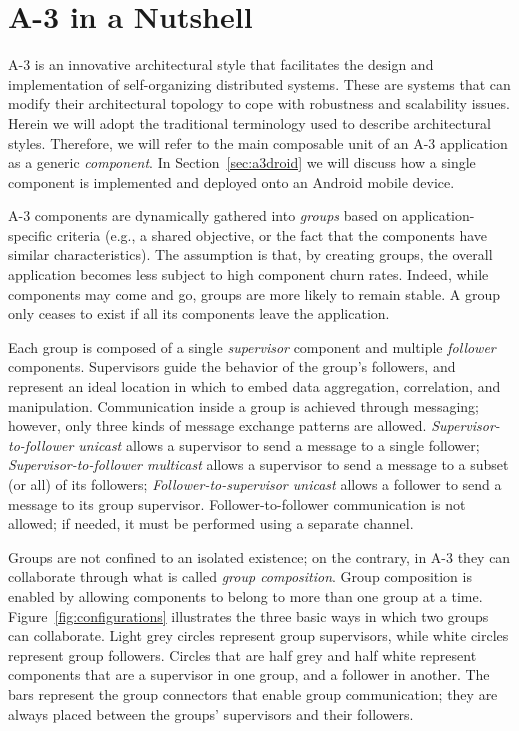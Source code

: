 \section{A-3 in a Nutshell}
\label{sec:a3}

A-3 is an innovative architectural style that facilitates the design and implementation of self-organizing distributed systems. These are systems that can modify their architectural topology to cope with robustness and scalability issues. Herein we will adopt the traditional terminology used to describe architectural styles. Therefore, we will refer to the main composable unit of an A-3 application as a generic \emph{component}. In Section~\ref{sec:a3droid} we will discuss how a single component is implemented and deployed onto an Android mobile device.

A-3 components are dynamically gathered into \emph{groups} based on application-specific criteria (e.g., a shared objective, or the fact that the components have similar characteristics). The assumption is that, by creating groups, the overall application becomes less subject to high component churn rates. Indeed, while components may come and go, groups are more likely to remain stable. A group only ceases to exist if all its components leave the application. 

Each group is composed of a single \emph{supervisor} component and multiple \emph{follower} components. Supervisors guide the behavior of the group's followers, and represent an ideal location in which to embed data aggregation, correlation, and manipulation. Communication inside a group is achieved through  messaging; however, only three kinds of message exchange patterns are allowed. \emph{Supervisor-to-follower unicast} allows a supervisor to send a message to a single follower; \emph{Supervisor-to-follower multicast} allows a supervisor to send a message to a subset (or all) of its followers; \emph{Follower-to-supervisor unicast} allows a follower to send a message to its group supervisor. Follower-to-follower communication is not allowed; if needed, it must be performed using a separate channel. 

Groups are not confined to an isolated existence; on the contrary, in A-3 they can collaborate through what is called \emph{group composition}. Group composition is enabled by allowing components to belong to more than one group at a time. Figure~\ref{fig:configurations} illustrates the three basic ways in which two groups can collaborate. Light grey circles represent group supervisors, while white circles represent group followers. Circles that are half grey and half white represent components that are a supervisor in one group, and a follower in another. The bars represent the group connectors that enable group communication; they are always placed between the groups' supervisors and their followers. 

